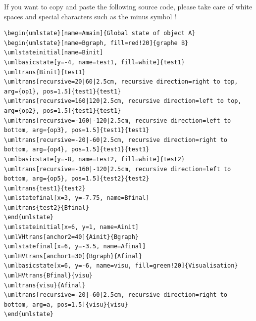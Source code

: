 \documentclass[a4paper,11pt, svgnames]{article}
\date{}
\title{}
\author{}
\begin{document}
\maketitle

If you want to copy and paste the following source code, please take care of white spaces and special characters such as the minus symbol !

\medskip
\lstset{breaklines=true, frame=trBL, language=tikzuml}
\begin{lstlisting}
\begin{umlstate}[name=Amain]{Global state of object A}
\begin{umlstate}[name=Bgraph, fill=red!20]{graphe B}
\umlstateinitial[name=Binit]
\umlbasicstate[y=-4, name=test1, fill=white]{test1}
\umltrans{Binit}{test1}
\umltrans[recursive=20|60|2.5cm, recursive direction=right to top, arg={op1}, pos=1.5]{test1}{test1}
\umltrans[recursive=160|120|2.5cm, recursive direction=left to top, arg={op2}, pos=1.5]{test1}{test1}
\umltrans[recursive=-160|-120|2.5cm, recursive direction=left to bottom, arg={op3}, pos=1.5]{test1}{test1}
\umltrans[recursive=-20|-60|2.5cm, recursive direction=right to bottom, arg={op4}, pos=1.5]{test1}{test1}
\umlbasicstate[y=-8, name=test2, fill=white]{test2}
\umltrans[recursive=-160|-120|2.5cm, recursive direction=left to bottom, arg={op5}, pos=1.5]{test2}{test2}
\umltrans{test1}{test2}
\umlstatefinal[x=3, y=-7.75, name=Bfinal]
\umltrans{test2}{Bfinal}
\end{umlstate}
\umlstateinitial[x=6, y=1, name=Ainit]
\umlVHtrans[anchor2=40]{Ainit}{Bgraph}
\umlstatefinal[x=6, y=-3.5, name=Afinal]
\umlHVtrans[anchor1=30]{Bgraph}{Afinal}
\umlbasicstate[x=6, y=-6, name=visu, fill=green!20]{Visualisation}
\umlHVtrans{Bfinal}{visu}
\umltrans{visu}{Afinal}
\umltrans[recursive=-20|-60|2.5cm, recursive direction=right to bottom, arg=a, pos=1.5]{visu}{visu}
\end{umlstate}
\end{lstlisting}
\end{document}
